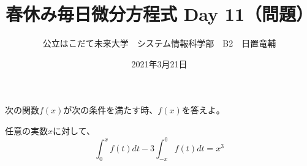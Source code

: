 \documentclass[dvipdfmx,uplatex]{jsarticle}
\title{春休み毎日微分方程式 Day 11（問題）}
\author{公立はこだて未来大学　システム情報科学部　B2　日置竜輔}
\date{2021年3月21日}
\begin{document}
\begin{spacing}{1.6}
\maketitle

次の関数$f(x)$が次の条件を満たす時、$f(x)$を答えよ。\\
\begin{qparts}
  \qpart 任意の実数$x$に対して、
  \begin{equation*}
    \int_0^x f(t)dt - 3\int_{-x}^0 f(t)dt = x^3
  \end{equation*}
  \end{qparts}
\end{spacing}
\end{document}

